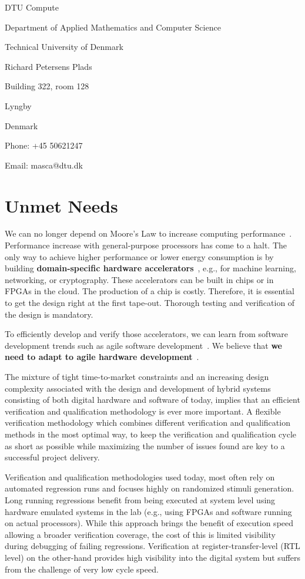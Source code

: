 \documentclass[fleqn,12pt]{article}
\begin{document}
\bigskip

\noindent DTU Compute

\noindent Department of Applied Mathematics and Computer Science

\noindent Technical University of Denmark

\noindent Richard Petersens Plads

\noindent Building 322, room 128

 Lyngby

\noindent Denmark

\bigskip


\noindent Phone: +45 50621247

\noindent Email: masca@dtu.dk


\newpage
\section*{Unmet Needs}

We can no longer depend on Moore's Law to increase computing performance~\cite{dark-silicon:2011}.
Performance increase with general-purpose processors has come to a halt.
The only way to achieve higher performance or lower energy consumption
is by building {\bf domain-specific hardware accelerators}~\cite{domain-hw-acc:2020},
e.g., for machine learning, networking, or cryptography.
These accelerators can be built in chips or in FPGAs in the cloud.
The production of a chip is costly. Therefore, it is essential to get
the design right at the first tape-out. Thorough testing and verification of the design is mandatory.

To efficiently develop and verify those accelerators, we can learn from software development trends such as agile software development~\cite{agile:manifesto}.
We believe that {\bf we need to adapt to agile hardware development}~\cite{henn-patt:turing:2019}.

The mixture of tight time-to-market constraints and an increasing design complexity associated with the design and development of hybrid systems consisting of both digital hardware and software of today, implies that an efficient verification and qualification methodology is ever more important.
A flexible verification methodology which combines different verification and qualification methods in the most optimal way, to keep the verification and qualification cycle as short as possible while maximizing the number of issues found are key to a successful project delivery.

Verification and qualification methodologies used today, most often rely on automated regression runs and focuses highly on randomized stimuli generation. Long running regressions benefit from being executed at system level using hardware emulated systems in the lab (e.g., using FPGAs and software running on actual processors). While this approach brings the benefit of execution speed allowing a broader verification coverage, the cost of this is limited visibility during debugging of failing regressions. Verification at register-transfer-level (RTL level) on the other-hand provides high visibility into the digital system but suffers from the challenge of very low cycle speed.
\end{document}
